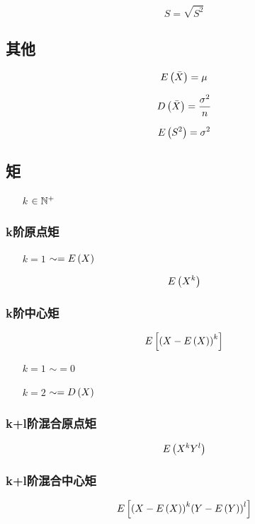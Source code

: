 \documentclass{article}
\begin{document}
\[S=\sqrt{S^2}\]

\subsection{其他}

\[E\left(\bar X\right)=\mu\]

\[D\left(\bar X\right)=\frac{\sigma^2}n\]

\[E\left(S^2\right)=\sigma^2\]

\subsection{矩}

\begin{enumerate}
    \item [$k$] $\in\mathbb N^+$
\end{enumerate}

\subsubsection{k阶原点矩}

\begin{enumerate}
    \item [$k=1$] $\sim=E\left(X\right)$
\end{enumerate}

\[E\left(X^k\right)\]

\subsubsection{k阶中心矩}

\[E\left[{\left(X-E\left(X\right)\right)}^k\right]\]

\begin{enumerate}
    \item [$k=1$] $\sim=0$
    \item [$k=2$] $\sim=D\left(X\right)$
\end{enumerate}

\subsubsection{k+l阶混合原点矩}

\[E\left(X^kY^l\right)\]

\subsubsection{k+l阶混合中心矩}

\[E\left[{\left(X-E\left(X\right)\right)}^k{\left(Y-E\left(Y\right)\right)}^l\right]\]
\end{document}
